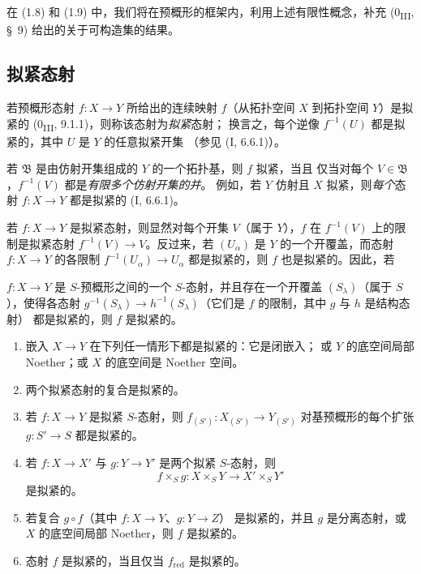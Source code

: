 在 (1.8) 和 (1.9) 中，我们将在预概形的框架内，利用上述有限性概念，补充
(0\textsubscript{III}, §~9) 给出的关于可构造集的结果。

\subsection{拟紧态射}
\label{subsection:IV.1.1-fr}

\begin{definition}[1.1.1]
\label{IV.1.1.1-fr}
若预概形态射 $f:X\to Y$ 所给出的连续映射 $f$（从拓扑空间 $X$ 到拓扑空间
$Y$）是拟紧的 (0\textsubscript{III}, 9.1.1)，则称该态射为\emph{拟紧}态射；
换言之，每个逆像 $f^{-1}(U)$ 都是拟紧的，其中 $U$ 是 $Y$ 的任意拟紧开集
（参见 (I, 6.6.1)）。
\end{definition}

若 $\mathfrak B$ 是由仿射开集组成的 $Y$ 的一个拓扑基，则 $f$ 拟紧，当且
仅当对每个 $V\in\mathfrak B$，$f^{-1}(V)$ 都是\emph{有限多个仿射开集的并}。
例如，若 $Y$ 仿射且 $X$ 拟紧，则\emph{每个}态射 $f:X\to Y$ 都是拟紧的
(I, 6.6.1)。

若 $f:X\to Y$ 是拟紧态射，则显然对每个开集 $V$（属于 $Y$），$f$ 在
$f^{-1}(V)$ 上的限制是拟紧态射 $f^{-1}(V)\to V$。反过来，若 $(U_\alpha)$
是 $Y$ 的一个开覆盖，而态射 $f:X\to Y$ 的各限制
$f^{-1}(U_\alpha)\to U_\alpha$ 都是拟紧的，则 $f$ 也是拟紧的。因此，若


$f:X\to Y$ 是 $S$-预概形之间的一个 $S$-态射，并且存在一个开覆盖
$(S_\lambda)$（属于 $S$），使得各态射
$g^{-1}(S_\lambda)\to h^{-1}(S_\lambda)$（它们是 $f$ 的限制，其中 $g$ 与
$h$ 是结构态射）
都是拟紧的，则 $f$ 是拟紧的。

\begin{proposition}[1.1.2]
\label{IV.1.1.2-fr}
\begin{enumerate}
  \item[(i)] 嵌入 $X\to Y$ 在下列任一情形下都是拟紧的：它是闭嵌入；
  或 $Y$ 的底空间局部 Noether；或 $X$ 的底空间是 Noether 空间。
  \item[(ii)] 两个拟紧态射的复合是拟紧的。
  \item[(iii)] 若 $f:X\to Y$ 是拟紧 $S$-态射，则
  $f_{(S')}:X_{(S')}\to Y_{(S')}$ 对基预概形的每个扩张 $g:S'\to S$
  都是拟紧的。
  \item[(iv)] 若 $f:X\to X'$ 与 $g:Y\to Y'$ 是两个拟紧 $S$-态射，则
  \[
    f\times_S g:X\times_S Y\to X'\times_S Y'
  \]
  是拟紧的。
  \item[(v)] 若复合 $g\circ f$（其中 $f:X\to Y$、$g:Y\to Z$）
  是拟紧的，并且 $g$ 是分离态射，或 $X$ 的底空间局部 Noether，则 $f$
  是拟紧的。
  \item[(vi)] 态射 $f$ 是拟紧的，当且仅当 $f_{\mathrm{red}}$ 是拟紧的。
\end{enumerate}
\end{proposition}

